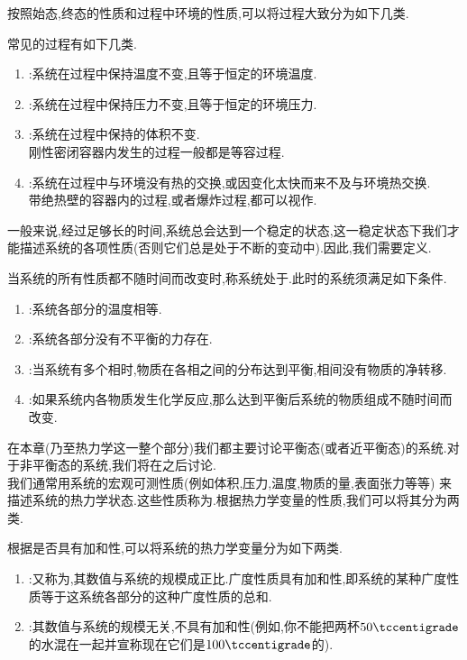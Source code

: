 \documentclass{ctexart}
\begin{document}
按照始态,终态的性质和过程中环境的性质,可以将过程大致分为如下几类.
\begin{definition}[2A.1.4 常见的过程]
    常见的过程有如下几类.
    \begin{enumerate}[label=\tbf{\arabic*.}]
        \item {}:系统在过程中保持温度不变,且等于恒定的环境温度.
        \item {}:系统在过程中保持压力不变,且等于恒定的环境压力.
        \item {}:系统在过程中保持的体积不变.\\
            刚性密闭容器内发生的过程一般都是等容过程.
        \item {}:系统在过程中与环境没有热的交换,或因变化太快而来不及与环境热交换.\\
            带绝热壁的容器内的过程,或者爆炸过程,都可以视作.
    \end{enumerate}
\end{definition}
一般来说,经过足够长的时间,系统总会达到一个稳定的状态,这一稳定状态下我们才能描述系统的各项性质(否则它们总是处于不断的变动中).因此,我们需要定义.
\begin{definition}[2A.1.5 热力学平衡状态]
    当系统的所有性质都不随时间而改变时,称系统处于.此时的系统须满足如下条件.
    \begin{enumerate}[label=\tbf{\arabic*.}]
        \item {}:系统各部分的温度相等.
        \item {}:系统各部分没有不平衡的力存在.
        \item {}:当系统有多个相时,物质在各相之间的分布达到平衡,相间没有物质的净转移.
        \item {}:如果系统内各物质发生化学反应,那么达到平衡后系统的物质组成不随时间而改变.
    \end{enumerate}
\end{definition}
在本章(乃至热力学这一整个部分)我们都主要讨论平衡态(或者近平衡态)的系统.对于非平衡态的系统,我们将在之后讨论.\vspace{4pt}\\
\indent 我们通常用系统的宏观可测性质(例如体积,压力,温度,物质的量,表面张力等等)%
来描述系统的热力学状态.这些性质称为.根据热力学变量的性质,我们可以将其分为两类.
\begin{definition}[2A.1.5 热力学变量的分类]
    根据是否具有加和性,可以将系统的热力学变量分为如下两类.
    \begin{enumerate}[label=\tbf{\arabic*.}]
        \item {}:又称为,其数值与系统的规模成正比.广度性质具有加和性,即系统的某种广度性质等于这系统各部分的这种广度性质的总和.
        \item {}:其数值与系统的规模无关,不具有加和性(例如,你不能把两杯$50\tccentigrade$的水混在一起并宣称现在它们是$100\tccentigrade$的).
    \end{enumerate}
\end{definition}
\end{document}
